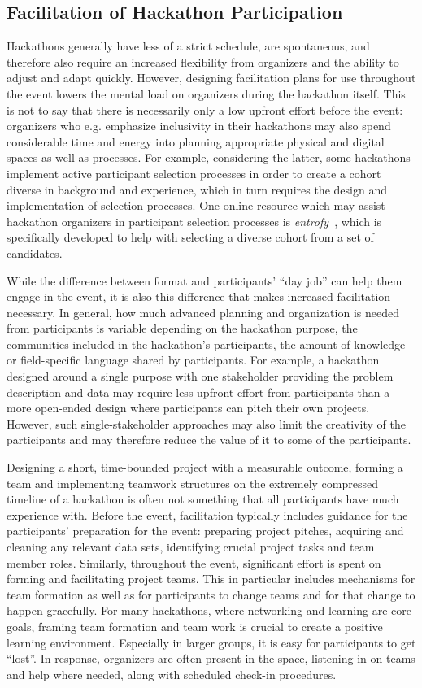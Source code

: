 \documentclass{ieeeaccess}
\begin{document}
\subsection{Facilitation of Hackathon Participation}
Hackathons generally have less of a strict schedule, are spontaneous, and therefore also require an increased flexibility from organizers and the ability to adjust and adapt quickly. 
However, designing facilitation plans for use throughout the event lowers the mental load on organizers during the hackathon itself.
This is not to say that there is necessarily only a low upfront effort before the event: organizers who e.g. emphasize inclusivity in their hackathons may also spend considerable time and energy into planning appropriate physical and digital spaces as well as processes.  
For example, considering the latter, some hackathons implement active participant selection processes in order to create a cohort diverse in background and experience, which in turn requires the design and implementation of selection processes.
One online resource which may assist hackathon organizers in participant selection processes is \textit{entrofy}~\cite{huppenkothen2020entrofy}, which is specifically developed to help with selecting a diverse cohort from a set of candidates. 

While the difference between format and participants' ``day job'' can help them engage in the event, it is also this difference that makes increased facilitation necessary. 
In general, how much advanced planning and organization is needed from participants is variable depending on the hackathon purpose, the communities included in the hackathon's participants, the amount of knowledge or field-specific language shared by participants. 
For example, a hackathon designed around a single purpose with one stakeholder providing the problem description and data may require less upfront effort from participants than a more open-ended design where participants can pitch their own projects.
However, such single-stakeholder approaches may also limit the creativity of the participants and may therefore reduce the value of it to some of the participants.

Designing a short, time-bounded project with a measurable outcome, forming a team and implementing teamwork structures on the extremely compressed timeline of a hackathon is often not something that all participants have much experience with. 
Before the event, facilitation typically includes guidance for the participants' preparation for the event: preparing project pitches, acquiring and cleaning any relevant data sets, identifying crucial project tasks and team member roles. 
Similarly, throughout the event, significant effort is spent on forming and facilitating project teams. 
This in particular includes mechanisms for team formation as well as for participants to change teams and for that change to happen gracefully. 
For many hackathons, where networking and learning are core goals, framing team formation and team work is crucial to create a positive learning environment. 
Especially in larger groups, it is easy for participants to get ``lost''. 
In response, organizers are often present in the space, listening in on teams and help where needed, along with scheduled check-in procedures. 
\end{document}
